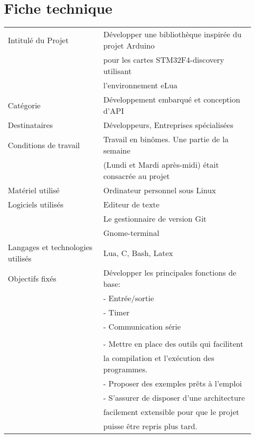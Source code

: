 \chapter*{Fiche technique} \label{chap:fiche}

\begin{table}[h]
 \begin{tabular}{|l|l|} \hline
Intitulé du Projet & Développer une bibliothèque inspirée du projet Arduino \\
  & pour les cartes STM32F4-discovery utilisant \\
  & l'environnement eLua \\ \hline
Catégorie & Développement embarqué et conception d'API \\ \hline
Destinataires & Développeurs, Entreprises spécialisées \\ \hline
Conditions de travail & Travail en binômes. Une partie de la semaine \\
  & (Lundi et Mardi après-midi) était consacrée au projet \\ \hline
Matériel utilisé & Ordinateur personnel sous Linux \\ \hline
Logiciels utilisés & Editeur de texte \\
 & Le gestionnaire de version Git \\
 & Gnome-terminal \\ \hline
Langages et technologies utilisés & Lua, C, Bash, Latex \\ \hline
Objectifs fixés & Développer les principales fonctions de base: \\ 
 & - Entrée/sortie \\
 & - Timer \\
 & - Communication série \\ 
 & \\
 & - Mettre en place des outils qui facilitent \\
 &   la compilation et l’exécution des programmes. \\
 & - Proposer des exemples prêts à l’emploi \\
 & - S’assurer de disposer d’une architecture \\
 &   facilement extensible pour que le projet \\
 &   puisse être repris plus tard.  \\
\hline
 \end{tabular}
\end{table}
